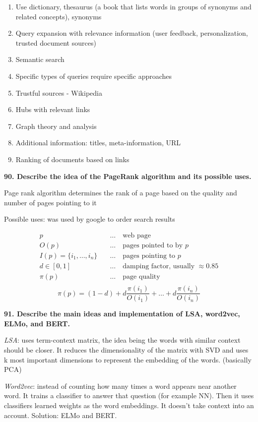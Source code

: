 \begin{enumerate}
\def\labelenumi{\arabic{enumi}.}
\item Use dictionary, thesaurus (a book that lists words in groups of
  synonyms and related concepts), synonyms
\item Query expansion with relevance information (user feedback,
  personalization, trusted document sources)
\item Semantic search
\item Specific types of queries require specific approaches
\item Trustful sources - Wikipedia
\item Hubs with relevant links
\item Graph theory and analysis
\item Additional information: titles, meta-information, URL
\item Ranking of documents based on links
\end{enumerate}

\textbf{90. Describe the idea of the PageRank algorithm and its possible uses.}

Page rank algorithm determines the rank of a page based on the quality
and number of pages pointing to it

Possible uses: was used by google to order search results

\begin{align*}
  p \quad &\dots \quad \text{web page} \\
  O(p) \quad &\dots \quad \text{pages pointed to by $p$} \\
  I(p) = \{i_1, \dots, i_n\} \quad &\dots \quad \text{pages pointing to $p$} \\
  d \in [0, 1] \quad &\dots \quad \text{damping factor, usually $\approx 0.85$} \\
  \pi(p) \quad &\dots \quad \text{page quality} \\
\end{align*}
\[ \pi(p) = (1-d) + d\frac{\pi(i_1)}{O(i_1)} + \dots + d\frac{\pi(i_n)}{O(i_n)}\]


\textbf{91. Describe the main ideas and implementation of LSA, word2vec,
ELMo, and BERT.}

\textit{LSA}: uses term-context matrix, the idea being the words with
similar context should be closer. It reduces the dimensionality of the
matrix with SVD and uses k most important dimensions to represent the
embedding of the words. (basically PCA)

\textit{Word2vec}: instead of counting how many times a word appears
near another word. It trains a classifier to answer that question (for
example NN). Then it uses classifiers learned weights as the word
embeddings. It doesn't take context into an account. Solution: ELMo and
BERT.

